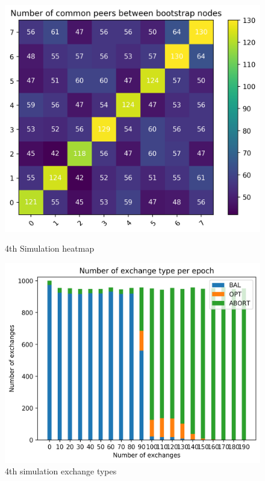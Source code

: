 \documentclass[mscthesis]{usiinfthesis}
\begin{document}
\begin{figure}[!htb]
   \begin{minipage}{0.49\textwidth}
     \centering
     \includegraphics[width=\linewidth]{images/4/4-heatmap.png}
  	\caption{4th Simulation heatmap}
  	\label{fig:sim-one-conv}
   \end{minipage}\hfill
   \begin{minipage}{0.49\textwidth}
     \centering
     \includegraphics[width=\linewidth]{images/4/4-ex-type.png}
       \caption{4th simulation exchange types}
 		\label{fig:sim-two-conv}
   \end{minipage}
\end{figure}
\end{document}
